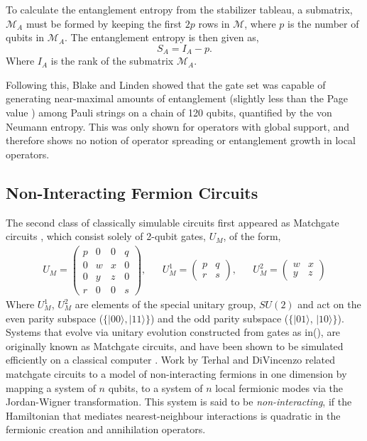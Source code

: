 To calculate the entanglement entropy from the stabilizer tableau, a submatrix, $\mathcal{M}_A$ must be formed by keeping the first $2p$ rows in $\mathcal{M}$, where $p$ is the number of qubits in $\mathcal{M}_A$. The entanglement entropy is then given as, 
\begin{equation}
    S_A = I_A - p.
\end{equation}
Where $I_A$ is the rank of the submatrix $\mathcal{M}_A$.

Following this, Blake and Linden showed that the gate set was capable of generating near-maximal amounts
of entanglement (slightly less than the Page value \cite{Page_1993}) among Pauli strings on a chain of 120 qubits,
quantified by the von Neumann entropy. This was only shown for operators with global support, and therefore
shows no notion of operator spreading or entanglement growth in local operators. 




\subsection{Non-Interacting Fermion Circuits}

The second class of classically simulable circuits first appeared as Matchgate circuits \cite{Valiant2001QuantumCT}, which consist solely of 2-qubit gates, $U_{M}$, of the form, 
\begin{align}\label{matchgate}
    U_M = \begin{pmatrix}
        p & 0 & 0 & q \\
        0 & w & x & 0 \\
        0 & y & z & 0 \\
        r & 0 & 0 & s
    \end{pmatrix}, 
    &&
    U^1_M =\begin{pmatrix}
        p & q \\
        r & s
    \end{pmatrix},
    &&
    U^2_M =\begin{pmatrix}
        w & x \\
        y & z
    \end{pmatrix}
\end{align}
Where $U^1_M$, $U^2_M$ are elements of the special unitary group, $SU(2)$ and act on the even parity subspace ($\{|00\rangle, |11\rangle\}$) and the odd parity subspace ($\{|01\rangle$, $|10\rangle\}$).
Systems that evolve via unitary evolution constructed from gates as in(),  are originally known as Matchgate circuits, and have been shown to be simulated efficiently on a classical computer \cite{Jozsa_2008}. Work by Terhal and DiVincenzo \cite{Terhal2001} related matchgate circuits to a model of non-interacting fermions in one dimension by mapping a system of $n$ qubits, to a system of $n$ local fermionic modes via the Jordan-Wigner transformation. This system is said to be \textit{non-interacting}, if the Hamiltonian that mediates nearest-neighbour interactions is quadratic in the fermionic creation and annihilation operators. 

